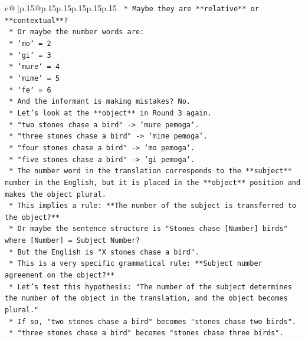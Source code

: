 \documentclass{article}
\begin{document}
{\begin{supertabular}{c@{$\;$}|p{.15\linewidth}@{}p{.15\linewidth}p{.15\linewidth}p{.15\linewidth}p{.15\linewidth}p{.15\linewidth}}
{{{\texttt{                *   Maybe they are **relative** or **contextual**?} \\
\texttt{                *   Or maybe the number words are:} \\
\texttt{                    *   `mo` = 2} \\
\texttt{                    *   `gi` = 3} \\
\texttt{                    *   `mure` = 4} \\
\texttt{                    *   `mime` = 5} \\
\texttt{                    *   `fe` = 6} \\
\texttt{                *   And the informant is making mistakes? No.} \\
\texttt{                *   Let's look at the **object** in Round 3 again.} \\
\texttt{                    *   "two stones chase a bird" {-}> `mure pemoga`.} \\
\texttt{                    *   "three stones chase a bird" {-}> `mime pemoga`.} \\
\texttt{                    *   "four stones chase a bird" {-}> `mo pemoga`.} \\
\texttt{                    *   "five stones chase a bird" {-}> `gi pemoga`.} \\
\texttt{                *   The number word in the translation corresponds to the **subject** number in the English, but it is placed in the **object** position and makes the object plural.} \\
\texttt{                *   This implies a rule: **The number of the subject is transferred to the object?**} \\
\texttt{                *   Or maybe the sentence structure is "Stones chase {[}Number{]} birds" where {[}Number{]} = Subject Number?} \\
\texttt{                *   But the English is "X stones chase a bird".} \\
\texttt{                *   This is a very specific grammatical rule: **Subject number agreement on the object?**} \\
\texttt{                *   Let's test this hypothesis: "The number of the subject determines the number of the object in the translation, and the object becomes plural."} \\
\texttt{                *   If so, "two stones chase a bird" becomes "stones chase two birds".} \\
\texttt{                *   "three stones chase a bird" becomes "stones chase three birds".} \\
}}}
\end{supertabular}}
\end{document}
